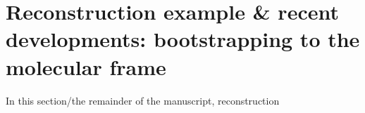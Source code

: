 \section{Reconstruction example & recent developments: bootstrapping to the molecular frame}

In this section/the remainder of the manuscript, reconstruction 